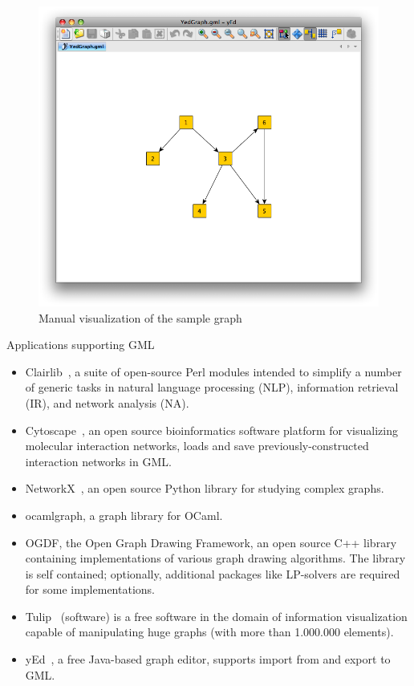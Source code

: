 \begin{figure}[h!]
\centering
\includegraphics[scale=0.5]{pictures/YedGraph.png}
\caption{Manual visualization of the sample graph}
\label{fig:yed_graph_vis}
\end{figure}

Applications supporting GML~\cite{GML_wiki}

\begin{itemize}
\item Clairlib~\cite{clairlib}, a suite of open-source Perl modules intended to simplify a number of generic tasks in natural language processing (NLP), information retrieval (IR), and network analysis (NA).
\item Cytoscape~\cite{Cytoscape}, an open source bioinformatics software platform for visualizing molecular interaction networks, loads and save previously-constructed interaction networks in GML.
\item NetworkX~\cite{NetworkX}, an open source Python library for studying complex graphs.
\item ocamlgraph\cite{ocamlgraph}, a graph library for OCaml.
\item OGDF\cite{OGDF}, the Open Graph Drawing Framework, an open source C++ library containing implementations of various graph drawing algorithms. The library is self contained; optionally, additional packages like LP-solvers are required for some implementations.
\item Tulip~\cite{Tulip} (software) is a free software in the domain of information visualization capable of manipulating huge graphs (with more than 1.000.000 elements).
\item yEd~\cite{yed}, a free Java-based graph editor, supports import from and export to GML.
\end{itemize}

